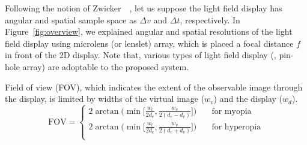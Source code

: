 Following the notion of Zwicker~\etal~\cite{zwicker2006antialiasing}, let us suppose the light field display has angular and spatial sample space as $\Delta v$ and $\Delta t$, respectively. In Figure~\ref{fig:overview}, we explained angular and spatial resolutions of the light field display using microlens (or lenslet) array, which is placed a focal distance $f$ in front of the 2D display. Note that, various types of light field display (\ie, pin-hole array) are adoptable to the proposed system.

Field of view (FOV), which indicates the extent of the observable image through the display, is limited by widths of the virtual image ($w_v$) and the display ($w_d$).
\[ \text{FOV} =
  \begin{cases}
    2\arctan\Big(\min\Big[\frac{w_l}{2d_e}, \frac{w_v}{2(d_e-d_v)}\Big]\Big)  & \quad \text{for myopia}\\
    2\arctan\Big(\min\Big[\frac{w_l}{2d_e}, \frac{w_v}{2(d_e+d_v)}\Big]\Big)  & \quad \text{for hyperopia}\\
  \end{cases}
\]




